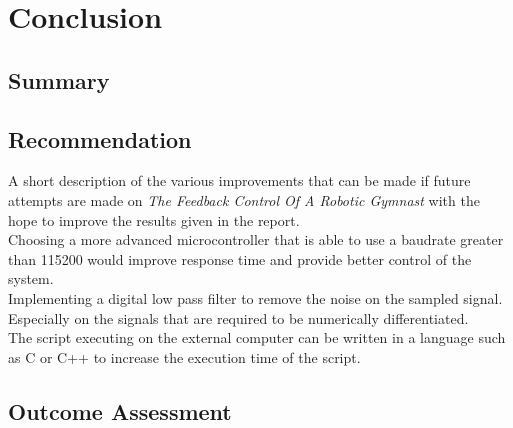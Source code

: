 \chapter{Conclusion}
\label{chp:conclusion}



\section{Summary}

\section{Recommendation}
A short description of the various improvements that can be made if future attempts are made on \textit{The Feedback Control Of A Robotic Gymnast} with the hope to improve the results given in the report.\\

Choosing a more advanced microcontroller that is able to use a baudrate greater than 115200 would improve response time and provide better control of the system.\\

Implementing a digital low pass filter to remove the noise on the sampled signal. Especially on the signals that are required to be numerically differentiated.\\

The script executing on the external computer can be written in a language such as C or C++ to increase the execution time of the script.\\

\newpage
\section{Outcome Assessment}


